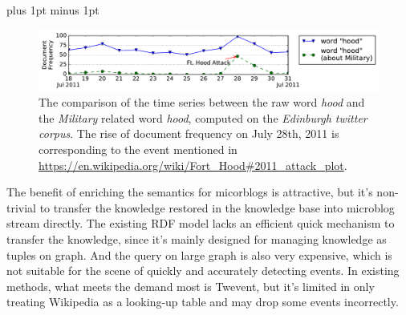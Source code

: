 \documentclass[runningheads,a4paper]{llncs}
\theoremstyle{exampstyle}
\begin{document}
\intextsep=1pt plus 1pt minus 1pt
\begin{figure}[h]
		\setlength{\abovecaptionskip}{0.cm}
        \setlength{\belowcaptionskip}{0.cm}
        \centering
        \includegraphics[width=1.0\columnwidth]{img/hood.pdf}
        \caption{The comparison of the time series between the raw word \textit{hood} and the \textit{Military} related word \textit{hood}, computed on the \textit{Edinburgh twitter corpus}\cite{petrovic2012using}. The rise of document frequency on July 28th, 2011 is corresponding to the event mentioned in \url{https://en.wikipedia.org/wiki/Fort_Hood\#2011_attack_plot}.}
        \label{fig:hood}
\end{figure}

The benefit of enriching the semantics for micorblogs is attractive, but it's non-trivial to transfer the knowledge restored in the knowledge base into microblog stream directly.
The existing RDF model\cite{klyne2006rdf} lacks an efficient quick mechanism to transfer the knowledge, since it's mainly designed for managing knowledge as tuples on graph. And the query on large graph is also very expensive\cite{huang2011scalable}, which is not suitable for the scene of quickly and accurately detecting events.
In existing methods, what meets the demand most is Twevent\cite{Twevent2012}, but it's limited in only treating Wikipedia as a looking-up table and may drop some events incorrectly.
\end{document}
